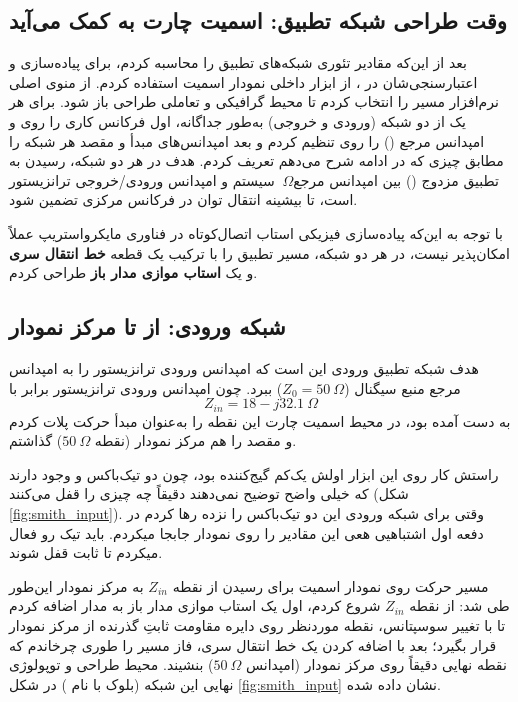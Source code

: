 \documentclass[12pt]{article}
\begin{document}
	\clearpage
	
	
	\subsection{وقت طراحی شبکه تطبیق: اسمیت چارت به کمک می‌آید}
	
	بعد از این‌که مقادیر تئوری شبکه‌های تطبیق را محاسبه کردم، برای پیاده‌سازی و اعتبارسنجی‌شان در ، از ابزار داخلی نمودار اسمیت استفاده کردم. از منوی اصلی نرم‌افزار مسیر  را انتخاب کردم تا محیط گرافیکی و تعاملی طراحی باز شود. برای هر یک از دو شبکه (ورودی و خروجی) به‌طور جداگانه، اول فرکانس کاری را روی  و امپدانس مرجع () را روی 
 تنظیم کردم و بعد امپدانس‌های 
	مبدأ و مقصد هر شبکه را مطابق چیزی که در ادامه شرح می‌دهم تعریف کردم. هدف در هر دو شبکه، رسیدن به تطبیق مزدوج () بین امپدانس مرجع$\ \Omega$	 سیستم و امپدانس ورودی/خروجی ترانزیستور است، تا بیشینه انتقال توان در فرکانس مرکزی  تضمین شود.
	
	با توجه به این‌که پیاده‌سازی فیزیکی استاب اتصال‌کوتاه در فناوری مایکرواستریپ عملاً امکان‌پذیر نیست، در هر دو شبکه، مسیر تطبیق را با ترکیب یک قطعه \textbf{خط انتقال سری}  و یک \textbf{استاب موازی مدار باز}  طراحی کردم.
	
	\subsection{شبکه ورودی: از \texorpdfstring{}{Zin} تا مرکز نمودار}
	
	هدف شبکه تطبیق ورودی این است که امپدانس ورودی ترانزیستور را به امپدانس مرجع منبع سیگنال ($Z_0 = 50\ \Omega$) ببرد. چون امپدانس ورودی ترانزیستور برابر با
	\[
	Z_{in} = 18 - j32.1\ \Omega
	\]
	به دست آمده بود، در محیط اسمیت چارت این نقطه را به‌عنوان مبدأ حرکت پلات کردم و مقصد را هم مرکز نمودار (نقطه $50\ \Omega$) گذاشتم.
	
	راستش کار روی این ابزار اولش یک‌کم گیج‌کننده بود، چون دو تیک‌باکس  و  وجود دارند که خیلی واضح توضیح نمی‌دهند دقیقاً چه چیزی را قفل می‌کنند (شکل \ref{fig:smith_input}). وقتی برای شبکه ورودی این دو تیک‌باکس را نزده رها کردم در دفعه اول اشتباهیی هعی این مقادیر را روی نمودار جابجا میکردم. باید تیک رو فعال میکردم تا ثابت قفل شوند.
	
	مسیر حرکت روی نمودار اسمیت برای رسیدن از نقطه $Z_{in}$ به مرکز نمودار این‌طور طی شد: از نقطه $Z_{in}$ شروع کردم، اول یک استاب موازی مدار باز به مدار اضافه کردم تا با تغییر سوسپتانس، نقطه موردنظر روی دایره مقاومت ثابتِ گذرنده از مرکز نمودار قرار بگیرد؛ بعد با اضافه کردن یک خط انتقال سری، فاز مسیر را طوری چرخاندم که نقطه نهایی دقیقاً روی مرکز نمودار (امپدانس $50\ \Omega$) بنشیند. محیط طراحی و توپولوژی نهایی این شبکه (بلوک  با نام ) در شکل \ref{fig:smith_input} نشان داده شده.
	
\end{document}
